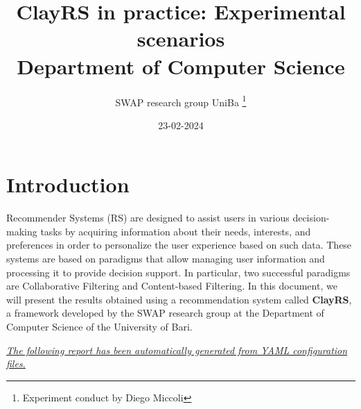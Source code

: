 \documentclass[11pt]{article}
\title{\textbf{ ClayRS in practice: Experimental scenarios }\\ [1cm] Department of Computer Science}
\author{ SWAP research group UniBa \thanks{Experiment conduct by Diego Miccoli}}
\date{23-02-2024}
\begin{document}
\maketitle

\section{Introduction}\label{sec:intro}
Recommender Systems (RS) are designed to assist users in various decision-making tasks by acquiring
information about their needs, interests, and preferences in order to personalize the user experience
based on such data.
These systems are based on paradigms that allow managing user information and processing
it to provide decision support.
In particular, two successful paradigms are Collaborative Filtering and Content-based Filtering.
In this document, we will present the results obtained using a recommendation system called \textbf{ClayRS},
a framework developed by the SWAP research group at the Department of Computer Science of the University of Bari.\\
\hfill\break

\textit{\ul{The following report has been automatically generated from YAML configuration files.}}

\hfill\break
\end{document}
